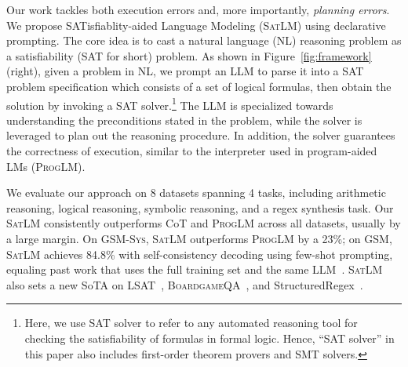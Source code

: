 \documentclass{article}
\theoremstyle{definition}
\newcommand{\gsm}{\textsc{GSM}}
\newcommand{\gsmsys}{\textsc{GSM-Sys}}
\newcommand{\lsat}{\textsc{LSAT}}
\newcommand{\boardgame}{\textsc{BoardgameQA}}
\newcommand{\satlm}{\textsc{SatLM}}
\newcommand{\pallm}{\textsc{ProgLM}}
\begin{document}
Our work tackles both execution errors and, more importantly, \emph{planning errors}.
We propose SATisfiablity-aided Language Modeling (\satlm{}) using declarative prompting. The core idea is to cast a natural language (NL) reasoning problem as a satisfiability (SAT for short) problem. As shown in Figure~\ref{fig:framework} (right), given a problem in NL, we prompt an LLM to parse it into a SAT problem specification which consists of a set of logical formulas, then obtain the solution by invoking a SAT solver.\footnote{Here, we use SAT solver to refer to any automated reasoning tool for checking the satisfiability of formulas in formal logic. Hence, ``SAT solver'' in this paper also includes first-order theorem provers and SMT solvers.} %
The LLM is specialized towards understanding the preconditions stated in the problem, while the solver is leveraged to plan out the reasoning procedure. In addition, the solver guarantees the correctness of execution, similar to the interpreter used in program-aided LMs (\pallm{}).

We evaluate our approach on 8 datasets spanning 4 tasks, including arithmetic reasoning, logical reasoning, symbolic reasoning, and a regex synthesis task. Our \satlm{} consistently outperforms {\sc CoT} and \pallm{} across all datasets, usually by a large margin. On \gsmsys{}, \satlm{} outperforms \pallm{} by a 23\%; on \gsm{}, \satlm{} achieves 84.8\% with self-consistency decoding using few-shot prompting, equaling past work that uses the full training set and the same LLM~\citep{li2022advance,ni2023lever}. \satlm{} also sets a new SoTA on \lsat{}~\citep{arlsat}, \boardgame{}~\citep{boardgameqa}, and {\sc StructuredRegex}~\citep{structuredregex}.
\end{document}
